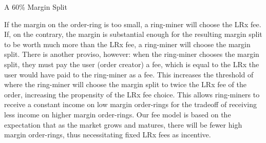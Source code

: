\documentclass[UTF8,nofonts]{ctexart}
\makeatletter
\newenvironment{figurehere}
 {\def\@captype{figure}}
 {}
\makeatother
\begin{document}
\begin{multicols}{2}
\begin{center}
\begin{figurehere}
\caption{A 60\% Margin Split}
\label{fig:marginsplit}
\end{figurehere}
\end{center}

If the margin on the order-ring is too small, a ring-miner will choose the LRx fee. If, on the contrary, the margin is substantial enough for the resulting margin split to be worth much more than the LRx fee, a ring-miner will choose the margin split. There is another proviso, however: when the ring-miner chooses the margin split, they must pay the user (order creator) a fee, which is equal to the LRx the user would have paid to the ring-miner as a fee. This increases the threshold of where the ring-miner will choose the margin split to twice the LRx fee of the order, increasing the propensity of the LRx fee choice. This allows ring-miners to receive a constant income on low margin order-rings for the tradeoff of receiving less income on higher margin order-rings. Our fee model is based on the expectation that as the market grows and matures, there will be fewer high margin order-rings, thus necessitating fixed LRx fees as incentive.


\end{multicols}
\end{document}
